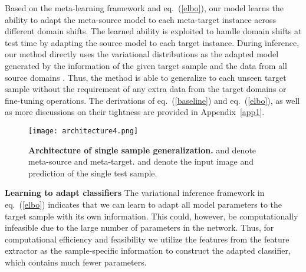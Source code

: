 \documentclass{article} \usepackage[table]{xcolor}
\begin{document}
Based on the meta-learning framework and eq.~(\ref{elbo}), our model learns the ability to adapt the meta-source model to each meta-target instance across different domain shifts.
The learned ability is exploited to handle domain shifts at test time by adapting the source model to each target instance.
During inference, our method directly uses the variational distributions  as the adapted model generated by the information of the given target sample  and the data from all source domains . Thus, the method is able to generalize to each unseen target sample without the requirement of any extra data from the target domains or fine-tuning operations. The derivations of eq.~(\ref{baseline}) and eq.~(\ref{elbo}), as well as more discussions on their tightness are provided in Appendix~\ref{app1}. 



\begin{wrapfigure}{r}{0.6\textwidth}
\vspace{-4.5mm}
\centering 
\centerline{
\texttt{[image: architecture4.png]}
} 
\vspace{-4mm}
\caption{\textbf{Architecture of single sample generalization.}  and  denote  meta-source and meta-target.  and  denote the input image and prediction of the single test sample. 
}
\label{model}
\vspace{-6mm}
\end{wrapfigure}

\vspace{-0.5mm}
\textbf{Learning to adapt classifiers}
The variational inference framework in eq.~(\ref{elbo}) indicates that we can learn to adapt all model parameters  to the target sample with its own information. 
This could, however, be computationally infeasible due to the large number of parameters in the network.
Thus, for computational efficiency and feasibility we utilize the features from the feature extractor as the sample-specific information to construct the adapted classifier, which contains much fewer parameters.
\end{document}
